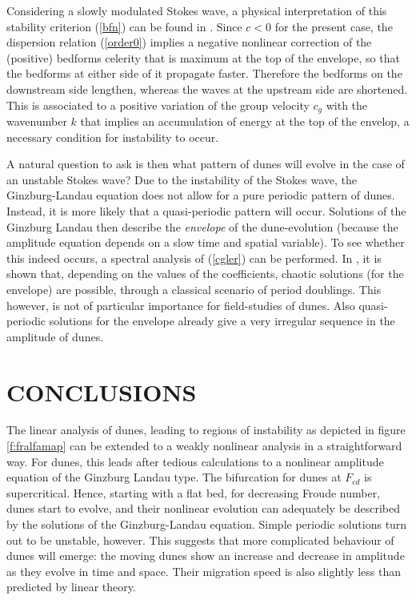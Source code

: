 \documentclass[12pt,a4paper,twocolumn,fleqn]{narms}
\begin{document}
Considering a slowly modulated Stokes wave, a physical interpretation
of this stability criterion (\ref{bfn}) can be found in
. Since $c<0$ for the present case, the dispersion
relation (\ref{order0}) implies a negative nonlinear correction of the
(positive) bedforms celerity that is maximum at the top of the
envelope, so that the bedforms at either side of it propagate
faster. Therefore the bedforms on the downstream side lengthen,
whereas the waves at the upstream side are shortened. This is
associated to a positive variation of the group velocity $c_g$ with
the wavenumber $k$ that implies an accumulation of energy at the top
of the envelop, a necessary condition for instability to occur.

A natural question to ask is then what pattern of dunes will evolve in
the case of an unstable Stokes wave? Due to the instability of the
Stokes wave, the Ginzburg-Landau equation does not allow for a pure
periodic pattern of dunes. Instead, it is more likely that a
quasi-periodic pattern will occur. Solutions of the Ginzburg Landau
then describe the {\it envelope} of the dune-evolution (because the
amplitude equation depends on a slow time and spatial variable).  To
see whether this indeed occurs, a spectral analysis of (\ref{cgler})
can be performed. In , it is shown that, depending
on the values of the coefficients, chaotic solutions (for the
envelope) are possible, through a classical scenario of period
doublings.  This however, is not of particular importance for
field-studies of dunes. Also quasi-periodic solutions for the envelope
already give a very irregular sequence in the amplitude of dunes.
\section{CONCLUSIONS}
The linear analysis of dunes, leading to regions of instability as
depicted in figure \ref{f:fralfamap} can be extended to a weakly
nonlinear analysis in a straightforward way. For dunes, this leads
after tedious calculations to a nonlinear amplitude equation of the
Ginzburg Landau type. The bifurcation for dunes at $F_{cd}$ is
supercritical. Hence, starting with a flat bed, for decreasing Froude
number, dunes start to evolve, and their nonlinear evolution can
adequately be described by the solutions of the Ginzburg-Landau
equation. Simple periodic solutions turn out to be unstable,
however. This suggests that more complicated behaviour of dunes will
emerge: the moving dunes show an increase and decrease in amplitude as
they evolve in time and space. Their migration speed is also slightly
less than predicted by linear theory.
\end{document}
